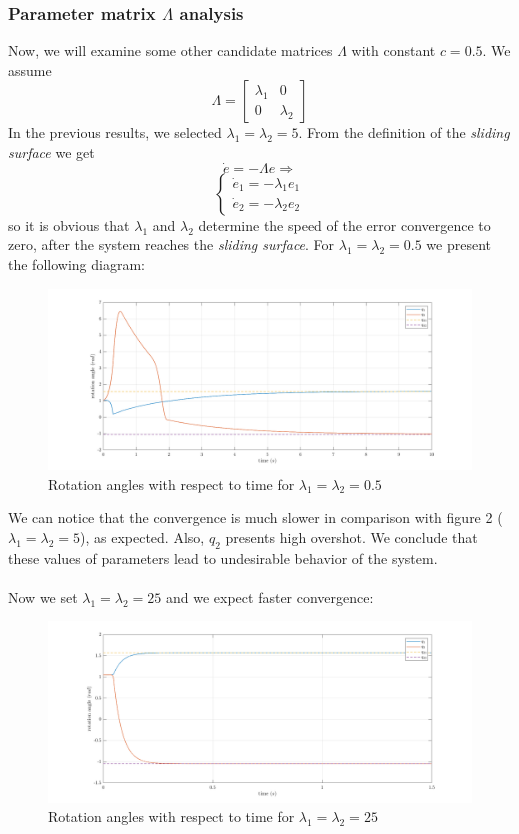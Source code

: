 \documentclass[a4paper]{article}
\begin{document}
\subsubsection{Parameter matrix $\Lambda$ analysis}
Now, we will examine some other candidate matrices $\Lambda$ with constant $c=0.5$. We assume 
$$
    \Lambda =   \begin{bmatrix}
                    \lambda_1 & 0 \\
                    0 & \lambda_2
                \end{bmatrix}
$$
In the previous results, we selected $\lambda_1 = \lambda_2 = 5$. From the definition of the \textit{sliding surface} we get 
$$
    \dot{e} = - \Lambda e \Rightarrow
$$
$$
    \begin{cases} \dot{e}_1 = - \lambda_1 e_1 \\ \dot{e}_2 = - \lambda_2 e_2 \end{cases}
$$
so it is obvious that $\lambda_1$ and $\lambda_2$ determine the speed of the error convergence to zero, 
after the system reaches the \textit{sliding surface}. For $\lambda_1 = \lambda_2 = 0.5$ we present the following diagram:
\begin{figure}[H]
    \centering
    \includegraphics[width=15cm]{fig/sim1/q05.png}
    \caption{Rotation angles with respect to time for $\lambda_1 = \lambda_2 = 0.5$}
\end{figure}

\noindent\hspace{-2pt}
We can notice that the convergence is much slower in comparison with figure 2 ($\lambda_1 = \lambda_2 = 5$), as expected. Also, $q_2$ presents 
high overshot. We conclude that these values of parameters lead to undesirable behavior of the system. \\\\
Now we set $\lambda_1 = \lambda_2 = 25$ and we expect faster convergence:
\begin{figure}[H]
    \centering
    \includegraphics[width=15cm]{fig/sim1/q25.png}
    \caption{Rotation angles with respect to time for $\lambda_1 = \lambda_2 = 25$}
\end{figure}
\end{document}
